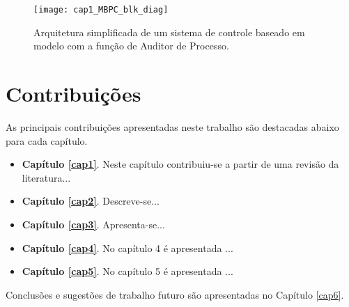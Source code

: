 \begin{figure}[!htbp]
\centering
\texttt{[image: cap1\_MBPC\_blk\_diag]} 
\caption{Arquitetura simplificada de um sistema de controle baseado em modelo com a função de Auditor de Processo.}
\label{fig_cap1_MBPC_blk_diag}
\end{figure}


\section{Contribuições}

As principais contribuições apresentadas neste trabalho são destacadas abaixo para cada capítulo.

\begin{itemize}

  \item \textbf{Capítulo \ref{cap1}}. Neste capítulo contribuiu-se a partir de uma revisão da literatura...
  
  \item \textbf{Capítulo \ref{cap2}}. Descreve-se...
  
  \item \textbf{Capítulo \ref{cap3}}. Apresenta-se...
  
  \item \textbf{Capítulo \ref{cap4}}. No capítulo 4 é apresentada ...
  
  \item \textbf{Capítulo \ref{cap5}}. No capítulo 5 é apresentada ...
  
\end{itemize}


Conclusões e sugestões de trabalho futuro são apresentadas no Capítulo \ref{cap6}.